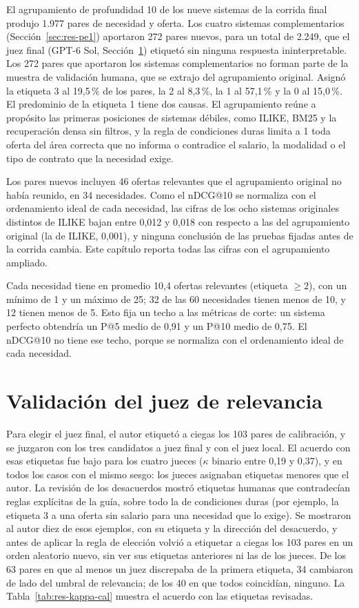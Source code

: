 El agrupamiento de profundidad 10 de los nueve sistemas de la corrida final produjo 1.977 pares de necesidad y oferta. Los cuatro sistemas complementarios (Sección~\ref{sec:res-pe1}) aportaron 272 pares nuevos, para un total de 2.249, que el juez final (GPT-6 Sol, Sección~\ref{sec:res-juez}) etiquetó sin ninguna respuesta ininterpretable. Los 272 pares que aportaron los sistemas complementarios no forman parte de la muestra de validación humana, que se extrajo del agrupamiento original. Asignó la etiqueta 3 al 19,5\,\% de los pares, la 2 al 8,3\,\%, la 1 al 57,1\,\% y la 0 al 15,0\,\%. El predominio de la etiqueta 1 tiene dos causas. El agrupamiento reúne a propósito las primeras posiciones de sistemas débiles, como ILIKE, BM25 y la recuperación densa sin filtros, y la regla de condiciones duras limita a 1 toda oferta del área correcta que no informa o contradice el salario, la modalidad o el tipo de contrato que la necesidad exige.

Los pares nuevos incluyen 46 ofertas relevantes que el agrupamiento original no había reunido, en 34 necesidades. Como el nDCG@10 se normaliza con el ordenamiento ideal de cada necesidad, las cifras de los ocho sistemas originales distintos de ILIKE bajan entre 0,012 y 0,018 con respecto a las del agrupamiento original (la de ILIKE, 0,001), y ninguna conclusión de las pruebas fijadas antes de la corrida cambia. Este capítulo reporta todas las cifras con el agrupamiento ampliado.

Cada necesidad tiene en promedio 10,4 ofertas relevantes (etiqueta $\geq 2$), con un mínimo de 1 y un máximo de 25; 32 de las 60 necesidades tienen menos de 10, y 12 tienen menos de 5. Esto fija un techo a las métricas de corte: un sistema perfecto obtendría un P@5 medio de 0,91 y un P@10 medio de 0,75. El nDCG@10 no tiene ese techo, porque se normaliza con el ordenamiento ideal de cada necesidad.

\section{Validación del juez de relevancia}
\label{sec:res-juez}

Para elegir el juez final, el autor etiquetó a ciegas los 103 pares de calibración, y se juzgaron con los tres candidatos a juez final y con el juez local. El acuerdo con esas etiquetas fue bajo para los cuatro jueces ($\kappa$ binario entre 0,19 y 0,37), y en todos los casos con el mismo sesgo: los jueces asignaban etiquetas menores que el autor. La revisión de los desacuerdos mostró etiquetas humanas que contradecían reglas explícitas de la guía, sobre todo la de condiciones duras (por ejemplo, la etiqueta 3 a una oferta sin salario para una necesidad que lo exige). Se mostraron al autor diez de esos ejemplos, con su etiqueta y la dirección del desacuerdo, y antes de aplicar la regla de elección volvió a etiquetar a ciegas los 103 pares en un orden aleatorio nuevo, sin ver sus etiquetas anteriores ni las de los jueces. De los 63 pares en que al menos un juez discrepaba de la primera etiqueta, 34 cambiaron de lado del umbral de relevancia; de los 40 en que todos coincidían, ninguno. La Tabla~\ref{tab:res-kappa-cal} muestra el acuerdo con las etiquetas revisadas.

